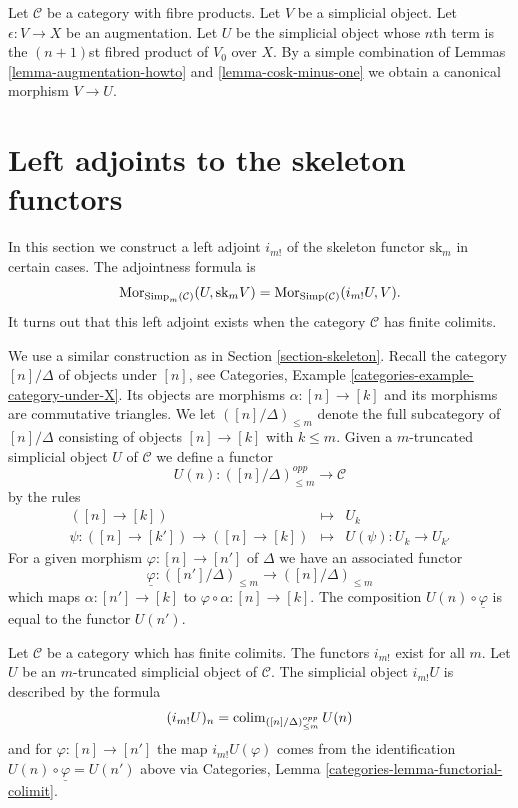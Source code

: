 \begin{remark}
\label{remark-augmentation}
Let $\mathcal{C}$ be a category with fibre products.
Let $V$ be a simplicial object.
Let $\epsilon : V \to X$ be an augmentation.
Let $U$ be the simplicial object whose $n$th term
is the $(n + 1)$st fibred product of $V_0$ over $X$.
By a simple combination of
Lemmas \ref{lemma-augmentation-howto} and \ref{lemma-cosk-minus-one}
we  obtain a canonical morphism
$V \to U$.
\end{remark}





\section{Left adjoints to the skeleton functors}
\label{section-adjoint-left}

\noindent
In this section we construct a left adjoint $i_{m!}$
of the skeleton functor $\text{sk}_m$ in certain cases.
The adjointness formula is
$$
\mathop{\mathrm{Mor}}\nolimits_{\text{Simp}_m(\mathcal{C})}(U, \text{sk}_mV)
=
\mathop{\mathrm{Mor}}\nolimits_{\text{Simp}(\mathcal{C})}(i_{m!}U, V).
$$
It turns out that this left adjoint exists when
the category $\mathcal{C}$ has finite colimits.

\medskip\noindent
We use a similar construction as in Section \ref{section-skeleton}.
Recall the category $[n]/\Delta$ of objects
under $[n]$, see
Categories, Example \ref{categories-example-category-under-X}.
Its objects are morphisms $\alpha : [n] \to [k]$
and its morphisms are commutative triangles.
We let $([n]/\Delta)_{\leq m}$ denote the full subcategory
of $[n]/\Delta$ consisting of objects $[n] \to [k]$
with $k \leq m$. Given a $m$-truncated
simplicial object $U$ of $\mathcal{C}$
we define a functor
$$
U(n) : ([n]/\Delta)_{\leq m}^{opp} \longrightarrow \mathcal{C}
$$
by the rules
\begin{eqnarray*}
([n] \to [k]) & \longmapsto & U_k \\
\psi : ([n] \to [k']) \to ([n] \to [k])
& \longmapsto &
U(\psi) : U_k \to U_{k'}
\end{eqnarray*}
For a given morphism $\varphi : [n] \to [n']$ of $\Delta$
we have an associated functor
$$
\underline{\varphi} :
([n']/\Delta)_{\leq m}
\longrightarrow
([n]/\Delta)_{\leq m}
$$
which maps $\alpha : [n'] \to [k]$ to
$\varphi \circ \alpha : [n] \to [k]$.
The composition $U(n) \circ \underline{\varphi}$ is
equal to the functor $U(n')$.

\begin{lemma}
\label{lemma-left-adjoint-exists}
Let $\mathcal{C}$ be a category which has finite colimits.
The functors $i_{m!}$ exist for all $m$.
Let $U$ be an $m$-truncated simplicial object of $\mathcal{C}$.
The simplicial object $i_{m!}U$
is described by the formula
$$
(i_{m!}U)_n = \mathop{\mathrm{colim}}\nolimits_{([n]/\Delta)_{\leq m}^{opp}} U(n)
$$
and for $\varphi : [n] \to [n']$ the map
$i_{m!}U(\varphi)$ comes from the
identification $U(n) \circ \underline{\varphi} = U(n')$ above
via Categories, Lemma \ref{categories-lemma-functorial-colimit}.
\end{lemma}

